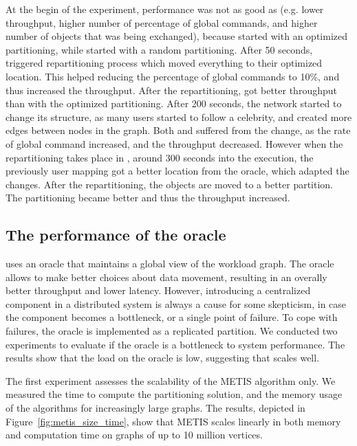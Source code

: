 At the begin of the experiment, \dynastar performance was not as good as \ssmr (e.g. lower throughput, higher number of
percentage of global commands, and higher number of objects that was being exchanged), because \ssmr started with an optimized
partitioning, while \dynastar started with a random partitioning. 
After 50 seconds, \dynastar triggered repartitioning process which moved everything to their optimized location. This helped
reducing the percentage of global commands to 10\%, and thus increased the throughput. After the repartitioning, \dynastar got better
throughput than \ssmr with the optimized partitioning.
After 200 seconds, the network started to change its structure, as many users started to follow a celebrity, and created more edges
between nodes in the graph. Both \dynastar and \ssmr suffered from the change, as the rate of global command increased, and the throughput
decreased. However when the repartitioning takes place in \dynastar, around 300 seconds into the execution, the previously user mapping
got a better location from the oracle, which adapted the changes. After the repartitioning, the objects are moved to a better partition.
The partitioning became better and thus the throughput increased.


\subsection{The performance of the oracle}

\dynastar  uses an oracle that maintains a global view of the workload graph. The oracle allows
\dynastar to make better choices about data movement, resulting in an overally
better throughput and lower latency. However, introducing a centralized
component in a distributed system is always a cause for some skepticism,
in case the component becomes a bottleneck, or a single point of failure. 
To cope with failures, the oracle is implemented as a replicated partition. 
We conducted two experiments to evaluate if the \dynastar oracle is a bottleneck to
system performance. The results show that the load on the oracle is
low, suggesting that \dynastar scales well.


The first experiment assesses the scalability of the METIS algorithm only.
We measured the time to compute the partitioning solution, and
the memory usage of the algorithms for increasingly large graphs. 
The results, depicted in Figure~\ref{fig:metis_size_time}, show that METIS scales
linearly in both memory and computation time on graphs of up to 10 million vertices.

